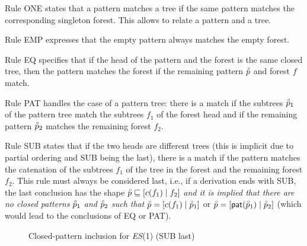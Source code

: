 Rule \textsf{ONE} states that a pattern matches a tree if the same
pattern matches the corresponding singleton forest. This allows to
relate a pattern and a tree.

Rule \textsf{EMP} expresses that the empty pattern always matches the
empty forest.

Rule \textsf{EQ} specifies that if the head of the pattern and the
forest is the same closed tree, then the pattern matches the forest if
the remaining pattern \(\accentset{\circ}{p}\) and forest \(f\) match.

Rule \textsf{PAT} handles the case of a pattern tree: there is a match
if the subtrees \(\accentset{\circ}{p}_1\) of the pattern tree match the subtrees
\(f_1\) of the forest head and if the remaining pattern
\(\accentset{\circ}{p}_2\) matches the remaining forest \(f_2\).

Rule \textsf{SUB} states that if the two heads are different trees
(this is implicit due to partial ordering and \textsf{SUB} being the
last), there is a match if the pattern matches the catenation of the
subtrees \(f_1\) of the tree in the forest and the remaining forest
\(f_2\). This rule must always be considered last, i.e., if a
derivation ends with \textsf{SUB}, the last conclusion has the shape
\(\accentset{\circ}{p} \sqsubseteq [{c(f_1)}\mid{f_2}]\) \emph{and it is implied
that there are no closed patterns} \(\accentset{\circ}{p}_1\) \emph{and}
\(\accentset{\circ}{p}_2\) \emph{such that} \(\accentset{\circ}{p} =
[{c(f_1)}\mid{\accentset{\circ}{p}_1}]\) or \(\accentset{\circ}{p} =
[{\textsf{pat}(\accentset{\circ}{p}_1)}\mid{\accentset{\circ}{p}_2}]\) (which would lead to the
conclusions of \textsf{EQ} or \textsf{PAT}).
\begin{figure}[H]
\caption{Closed\hyp{}pattern inclusion for \textit{ES}(1)%
(\textsf{SUB} last)
\label{es1_tree_inclusion_def}}
\end{figure}


